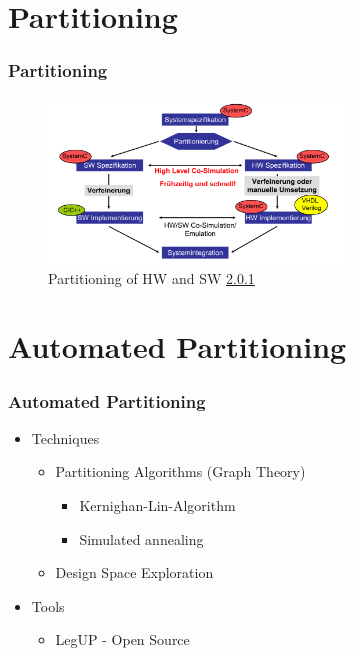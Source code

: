 \documentclass{beamer}
\begin{document}
\section{Partitioning}
\begin{frame}\frametitle{Partitioning} 
	    \begin{figure}[hp]
	      \centering
	      \includegraphics[width=0.7\textwidth]{pictures/design_flow.pdf}
	      \caption{Partitioning of HW and SW \ref{}}
	      \label{fig:flow}
	    \end{figure} 



\end{frame}


\section{Automated Partitioning}
\begin{frame}\frametitle{Automated Partitioning} 

\begin{itemize}
  \item Techniques
  \begin{itemize}
   \item Partitioning Algorithms (Graph Theory)
    \begin{itemize}
      \item{Kernighan-Lin-Algorithm}
      \item{Simulated annealing}  
    \end{itemize}
   \item Design Space Exploration
  \end{itemize}
  
  \item{Tools}
    \begin{itemize}
   \item{LegUP - Open Source}
    \end{itemize}
 \end{itemize}
\end{frame}
\end{document}
